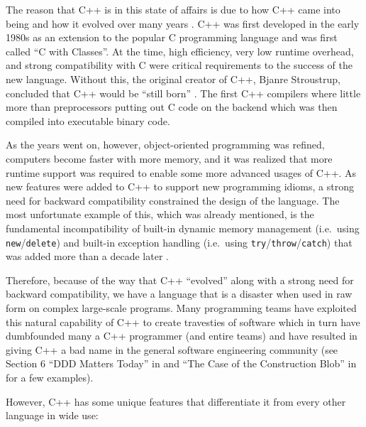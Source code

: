 \documentclass[pdf,ps2pdf,11pt]{SANDreport}
\begin{document}
The reason that C++ is in this state of affairs is due to how C++ came
into being and how it evolved over many years {}\cite{stroustrup94,
stroustrup07}.  C++ was first developed in the early 1980s as an
extension to the popular C programming language and was first called
``C with Classes''.  At the time, high efficiency, very low runtime
overhead, and strong compatibility with C were critical requirements
to the success of the new language.  Without this, the original
creator of C++, Bjanre Stroustrup, concluded that C++ would be ``still
born'' {}\cite{stroustrup97}.  The first C++ compilers where little
more than preprocessors putting out C code on the backend which was
then compiled into executable binary code.

As the years went on, however, object-oriented programming was
refined, computers become faster with more memory, and it was realized
that more runtime support was required to enable some more advanced
usages of C++.  As new features were added to C++ to support new
programming idioms, a strong need for backward compatibility
constrained the design of the language.  The most unfortunate example
of this, which was already mentioned, is the fundamental
incompatibility of built-in dynamic memory management (i.e.\ using
{}\texttt{new}/{}\texttt{delete}) and built-in exception handling
(i.e.\ using {}\texttt{try}/{}\texttt{throw}/{}\texttt{catch}) that
was added more than a decade later {}\cite{stroustrup94}.

Therefore, because of the way that C++ ``evolved'' along with a strong
need for backward compatibility, we have a language that is a disaster
when used in raw form on complex large-scale programs.  Many
programming teams have exploited this natural capability of C++ to
create travesties of software which in turn have dumbfounded many a
C++ programmer (and entire teams) and have resulted in giving C++ a
bad name in the general software engineering community (see Section 6
``DDD Matters Today'' in {}\cite{DomainDrivenDesignQuickly} and ``The
Case of the Construction Blob'' in {}\cite[Chapter
9]{WorkingEffectivelyWithLegacyCode05} for a few examples).

However, C++ has some unique features that differentiate it from every
other language in wide use:
\end{document}
